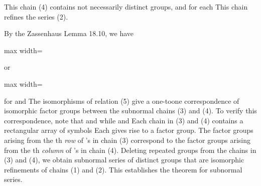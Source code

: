 \documentclass[11pt,oneside]{article}
\begin{document}
\begin{BookBody}
\noindent This chain (4) contains  not necessarily distinct groups, and  for each  This chain refines the series (2).

By the Zassenhaus Lemma 18.10, we have

\begin{center}\begin{adjustbox}{max width=\linewidth}\end{adjustbox}\end{center}

\noindent or

\begin{center}\begin{adjustbox}{max width=\linewidth}\end{adjustbox}\end{center}

\noindent for  and  The isomorphisms of relation (5) give a one-toone correspondence of isomorphic factor groups between the subnormal chains (3) and (4). To verify this correspondence, note that  and  while  and  Each chain in (3) and (4) contains a rectangular array of  symbols  Each \BookInline{\leq } gives rise to a factor group. The factor groups arising from the th\textit{ row} of \BookInline{\leq }’s 
in chain (3) correspond to the factor groups arising from the th\textit{ column} of \BookInline{\leq }’s in chain (4). Deleting repeated groups from the chains in (3) and (4), we obtain subnormal series of distinct groups that are isomorphic refinements of chains (1) and (2). This establishes the theorem for subnormal series.

\end{BookBody}

\BookNarrativetrue
\end{document}
